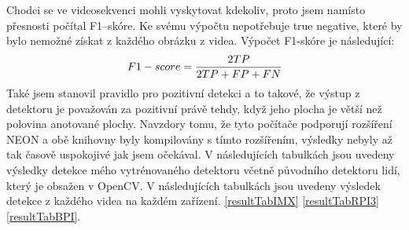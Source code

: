 Chodci se ve videosekvenci mohli vyskytovat kdekoliv, proto jsem namísto přesnosti počítal F1--skóre. Ke svému výpočtu nepotřebuje true negative, které by bylo nemožné získat z každého obrázku z videa. Výpočet F1-skóre je následující:
\begin{equation*}
\centering
 \label{eq:f1score}
 \begin{aligned}
F1-score = \frac{ 2TP}{2TP + FP + FN}
 \end{aligned}
\end{equation*}
Také jsem stanovil pravidlo pro pozitivní detekci a to takové, že výstup z detektoru je považován za pozitivní právě tehdy, když jeho plocha je větší než polovina anotované plochy. Navzdory tomu, že tyto počítače podporují rozšíření NEON a obě knihovny byly kompilovány s tímto rozšířením, výsledky nebyly až tak časově uspokojivé jak jsem očekával. V následujících tabulkách jsou uvedeny výsledky detekce mého vytrénovaného detektoru včetně původního detektoru lidí, který je obsažen v OpenCV.
V následujících tabulkách jsou uvedeny výsledek detekce z každého videa na každém zařízení. \ref{resultTabIMX} \ref{resultTabRPI3} \ref{resultTabBPI}.
